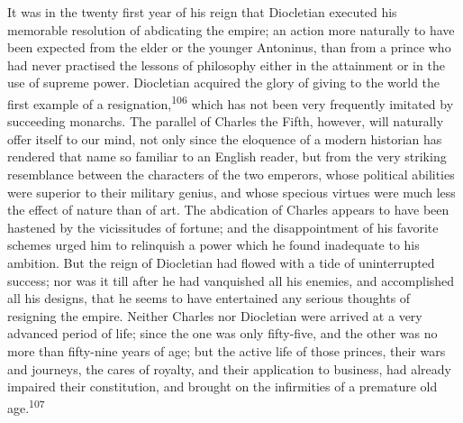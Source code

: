 It was in the twenty first year of his reign that Diocletian
executed his memorable resolution of abdicating the empire; an
action more naturally to have been expected from the elder or the
younger Antoninus, than from a prince who had never practised the
lessons of philosophy either in the attainment or in the use of
supreme power. Diocletian acquired the glory of giving to the
world the first example of a resignation,\textsuperscript{106} which has not been
very frequently imitated by succeeding monarchs. The parallel of
Charles the Fifth, however, will naturally offer itself to our
mind, not only since the eloquence of a modern historian has
rendered that name so familiar to an English reader, but from the
very striking resemblance between the characters of the two
emperors, whose political abilities were superior to their
military genius, and whose specious virtues were much less the
effect of nature than of art. The abdication of Charles appears
to have been hastened by the vicissitudes of fortune; and the
disappointment of his favorite schemes urged him to relinquish a
power which he found inadequate to his ambition. But the reign of
Diocletian had flowed with a tide of uninterrupted success; nor
was it till after he had vanquished all his enemies, and
accomplished all his designs, that he seems to have entertained
any serious thoughts of resigning the empire. Neither Charles nor
Diocletian were arrived at a very advanced period of life; since
the one was only fifty-five, and the other was no more than
fifty-nine years of age; but the active life of those princes,
their wars and journeys, the cares of royalty, and their
application to business, had already impaired their constitution,
and brought on the infirmities of a premature old age.\textsuperscript{107}



